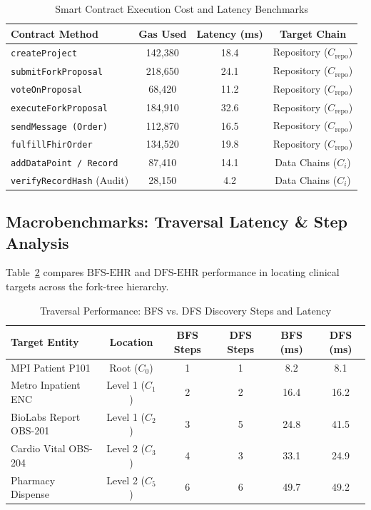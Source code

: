 \documentclass[journal]{IEEEtran}
\theoremstyle{definition}
\begin{document}
\begin{table}[htbp]
\centering
\caption{Smart Contract Execution Cost and Latency Benchmarks}
\label{tab:gas}
\begin{tabular}{lccc}
\toprule
\textbf{Contract Method} & \textbf{Gas Used} & \textbf{Latency (ms)} & \textbf{Target Chain} \\
\midrule
\texttt{createProject}            & 142,380 & 18.4 & Repository ($C_{\text{repo}}$) \\
\texttt{submitForkProposal}       & 218,650 & 24.1 & Repository ($C_{\text{repo}}$) \\
\texttt{voteOnProposal}           & 68,420  & 11.2 & Repository ($C_{\text{repo}}$) \\
\texttt{executeForkProposal}      & 184,910 & 32.6 & Repository ($C_{\text{repo}}$) \\
\texttt{sendMessage (Order)}      & 112,870 & 16.5 & Repository ($C_{\text{repo}}$) \\
\texttt{fulfillFhirOrder}         & 134,520 & 19.8 & Repository ($C_{\text{repo}}$) \\
\texttt{addDataPoint / Record}    & 87,410  & 14.1 & Data Chains ($C_i$) \\
\texttt{verifyRecordHash} (Audit) & 28,150  & 4.2  & Data Chains ($C_i$) \\
\bottomrule
\end{tabular}
\end{table}

\subsection{Macrobenchmarks: Traversal Latency \& Step Analysis}
Table~\ref{tab:traversal} compares $\text{BFS-EHR}$ and $\text{DFS-EHR}$ performance in locating clinical targets across the fork-tree hierarchy.

\begin{table}[htbp]
\centering
\caption{Traversal Performance: BFS vs. DFS Discovery Steps and Latency}
\label{tab:traversal}
\begin{tabular}{lccccc}
\toprule
\textbf{Target Entity} & \textbf{Location} & \textbf{BFS Steps} & \textbf{DFS Steps} & \textbf{BFS (ms)} & \textbf{DFS (ms)} \\
\midrule
MPI Patient P101       & Root ($C_0$)     & 1 & 1 & 8.2  & 8.1  \\
Metro Inpatient ENC    & Level 1 ($C_1$)  & 2 & 2 & 16.4 & 16.2 \\
BioLabs Report OBS-201 & Level 1 ($C_2$)  & 3 & 5 & 24.8 & 41.5 \\
Cardio Vital OBS-204   & Level 2 ($C_3$)  & 4 & 3 & 33.1 & 24.9 \\
Pharmacy Dispense      & Level 2 ($C_5$)  & 6 & 6 & 49.7 & 49.2 \\
\bottomrule
\end{tabular}
\end{table}
\end{document}

